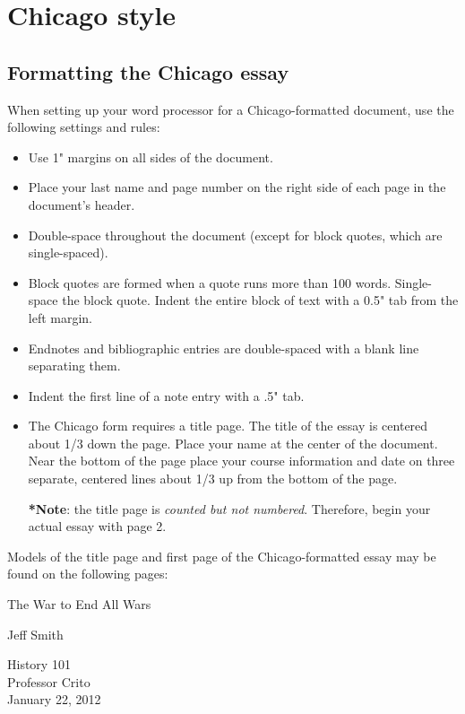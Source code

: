 
\chapter{Chicago style}

\section {Formatting the Chicago essay}

When setting up your word processor for a Chicago-formatted document, use the 
following settings and rules:

\begin{itemize}

\item Use 1" margins on all sides of the document.
\item Place your last name and page number on the right side of each page in the 
document's header.
\item Double-space throughout the document (except for block quotes, which are 
single-spaced).
\item Block quotes are formed when a quote runs more than 100 words. Single-space the 
block quote. Indent the entire block of text with a 0.5" tab from the left margin.
\item Endnotes and bibliographic entries are double-spaced with a blank line separating 
them.
\item Indent the first line of a note entry with a .5" tab.
\item The Chicago form requires a title page. The title of the essay is centered about 
1/3 down the page. Place your name at the center of the document. Near the bottom 
of the page place your course information and date on three separate, centered lines 
about 1/3 up from the bottom of the page.

\textbf{*}\textbf{Note}: the title page is \emph{counted but not numbered}. Therefore, 
begin your actual essay with page 2.
\end{itemize}

Models of the title page and first page of the Chicago-formatted essay may be found on 
the following pages:

\newpage
\thispagestyle{empty}
\begin{Spacing}{2}
\vspace* {3cm}
\begin{center}The War to End All Wars\end{center}
\vspace {4cm}
\begin{center}Jeff Smith\end{center}
\vspace {5cm}
\begin{center}History 101\\
Professor Crito\\
January 22, 2012\end{center}
\end{Spacing}
\newpage


